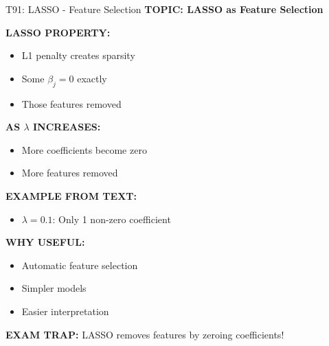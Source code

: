 \documentclass[8pt]{beamer}
\begin{document}
	\begin{frame}{T91: LASSO - Feature Selection}
		\fontsize{6.5}{7.5}\selectfont
		\textbf{TOPIC: LASSO as Feature Selection}
		
		\vspace{0.1cm}
		\textbf{LASSO PROPERTY:}
		\begin{itemize}
			\item L1 penalty creates sparsity
			\item Some $\beta_j = 0$ exactly
			\item Those features removed
		\end{itemize}
		
		\vspace{0.1cm}
		\textbf{AS $\lambda$ INCREASES:}
		\begin{itemize}
			\item More coefficients become zero
			\item More features removed
		\end{itemize}
		
		\vspace{0.1cm}
		\textbf{EXAMPLE FROM TEXT:}
		\begin{itemize}
			\item $\lambda = 0.1$: Only 1 non-zero coefficient
		\end{itemize}
		
		\vspace{0.1cm}
		\textbf{WHY USEFUL:}
		\begin{itemize}
			\item Automatic feature selection
			\item Simpler models
			\item Easier interpretation
		\end{itemize}
		
		\textcolor{myred}{\textbf{EXAM TRAP:}} LASSO \textcolor{myblue}{removes features} by zeroing coefficients!
	\end{frame}
	
\end{document}
